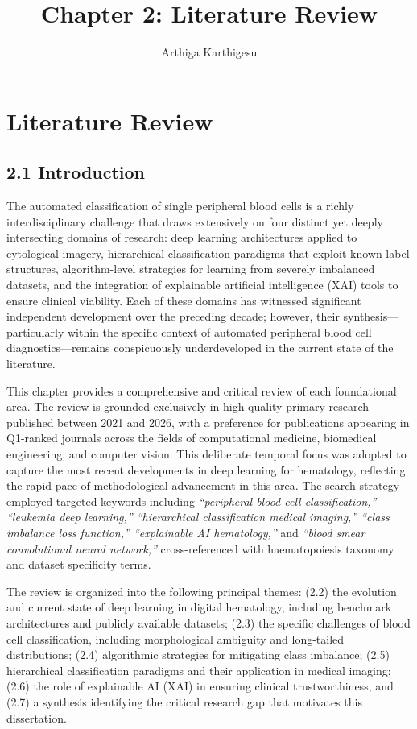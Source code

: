 \documentclass[11pt]{article}
\title{Chapter 2: Literature Review}
\author{Arthiga Karthigesu}
\date{}
\begin{document}
\maketitle

\section*{Literature Review}

\subsection*{2.1 Introduction}

The automated classification of single peripheral blood cells is a richly interdisciplinary challenge that draws extensively on four distinct yet deeply intersecting domains of research: deep learning architectures applied to cytological imagery, hierarchical classification paradigms that exploit known label structures, algorithm-level strategies for learning from severely imbalanced datasets, and the integration of explainable artificial intelligence (XAI) tools to ensure clinical viability. Each of these domains has witnessed significant independent development over the preceding decade; however, their synthesis—particularly within the specific context of automated peripheral blood cell diagnostics—remains conspicuously underdeveloped in the current state of the literature.

This chapter provides a comprehensive and critical review of each foundational area. The review is grounded exclusively in high-quality primary research published between 2021 and 2026, with a preference for publications appearing in Q1-ranked journals across the fields of computational medicine, biomedical engineering, and computer vision. This deliberate temporal focus was adopted to capture the most recent developments in deep learning for hematology, reflecting the rapid pace of methodological advancement in this area. The search strategy employed targeted keywords including \textit{``peripheral blood cell classification,'' ``leukemia deep learning,'' ``hierarchical classification medical imaging,'' ``class imbalance loss function,'' ``explainable AI hematology,''} and \textit{``blood smear convolutional neural network,''} cross-referenced with haematopoiesis taxonomy and dataset specificity terms.

The review is organized into the following principal themes: (2.2) the evolution and current state of deep learning in digital hematology, including benchmark architectures and publicly available datasets; (2.3) the specific challenges of blood cell classification, including morphological ambiguity and long-tailed distributions; (2.4) algorithmic strategies for mitigating class imbalance; (2.5) hierarchical classification paradigms and their application in medical imaging; (2.6) the role of explainable AI (XAI) in ensuring clinical trustworthiness; and (2.7) a synthesis identifying the critical research gap that motivates this dissertation.
\end{document}
